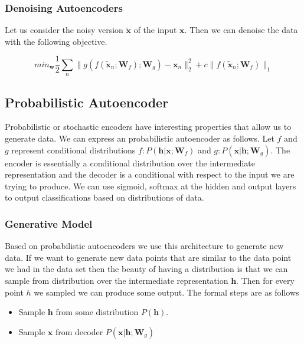 \documentclass[12pt]{article}
\begin{document}
        \subsubsection{Denoising Autoencoders}  
            Let us consider the noisy version $\tilde{\boldsymbol{x}}$ of the input $\boldsymbol{x}$. Then we can
            denoise the data with the following objective.

            $$ min_{\boldsymbol{w}} \frac{1}{2} \sum_n \| g(f(\boldsymbol{\tilde{x}}_n; \boldsymbol{W}_f); \boldsymbol{W}_g) -
            \boldsymbol{x}_n \|^2_2 + c \| f(\boldsymbol{\tilde{x}}_n; \boldsymbol{W}_f) \|_1 $$
        
    \subsection{Probabilistic Autoencoder}
        Probabilistic or stochastic encoders have interesting properties that allow us to generate data. We can express
        an probabilistic autoencoder as follows. Let $f$ and $g$ represent conditional distributions $f:
        P(\boldsymbol{h}|\boldsymbol{x}; \boldsymbol{W}_f)$ and $g: P(\boldsymbol{x}|\boldsymbol{h}; \boldsymbol{W}_g)$.
        The encoder is essentially a conditional distribution over the intermediate representation and the decoder is a
        conditional with respect to the input we are trying to produce. We can use sigmoid, softmax at the hidden and
        output layers to output classifications based on distributions of data. 

        \subsubsection{Generative Model} \label{sec:ProbGenModel}
            Based on probabilistic autoencoders we use this architecture to generate new data. If we want to generate
            new data points that are similar to the data point we had in the data set then the beauty of having a
            distribution is that we can sample from distribution over the intermediate representation $\boldsymbol{h}$.
            Then for every point $h$ we sampled we can produce some output. The formal steps are as follows

            \begin{itemize}
                \item Sample $\boldsymbol{h}$ from some distribution $P(\boldsymbol{h})$.
                \item Sample $\boldsymbol{x}$ from decoder $P(\boldsymbol{x}|\boldsymbol{h}; \boldsymbol{W}_g)$
            \end{itemize}
\end{document}
